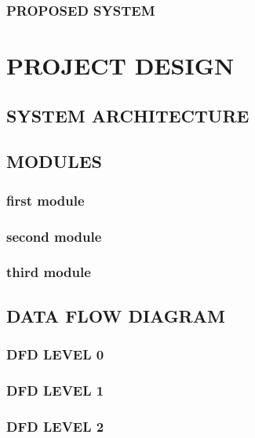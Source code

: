 \documentclass[a4paper,12pt,oneside]{report}  %
\begin{document}
\subsection{PROPOSED SYSTEM}

\newpage
\chapter{PROJECT DESIGN}
\vspace{-1 cm}
\section{SYSTEM ARCHITECTURE}
\section{MODULES}

\newline
\subsection{first module}

\subsection{second module}


\newline
\subsection{third module}



\section{DATA FLOW DIAGRAM}
\subsection{DFD LEVEL 0}
\renewcommand\thefigure{\thechapter.\arabic{figure}}


\subsection{DFD LEVEL 1}

\subsection{DFD LEVEL 2}
\renewcommand\thefigure{\thechapter.\arabic{figure}}
\end{document}
